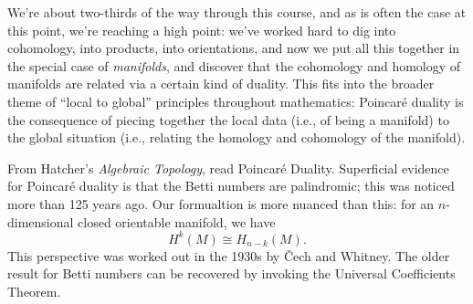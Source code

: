 \documentclass{homework}
\author{Jim Fowler}
\date{Week 11: Duality}
\begin{document}
\maketitle

We're about two-thirds of the way through this course, and as is often
the case at this point, we're reaching a high point: we've worked hard
to dig into cohomology, into products, into orientations, and now we
put all this together in the special case of \textit{manifolds}, and
discover that the cohomology and homology of manifolds are related via
a certain kind of duality.  This fits into the broader theme of
``local to global'' principles throughout mathematics: Poincar\'e
duality is the consequence of piecing together the local data (i.e.,
of being a manifold) to the global situation (i.e., relating the
homology and cohomology of the manifold).

From Hatcher's \textit{Algebraic Topology}, read 
Poincar\'e Duality.  Superficial evidence for Poincar\'e duality is
that the Betti numbers are palindromic; this was noticed more than 125
years ago.  Our formualtion is more nuanced than this: for an
$n$-dimensional closed orientable manifold, we have
\[
  H^k(M) \cong H_{n-k}(M).
\] This perspective was worked out in the 1930s by \v{C}ech and
Whitney.  The older result for Betti numbers can be recovered by
invoking the Universal Coefficients Theorem.
\end{document}
